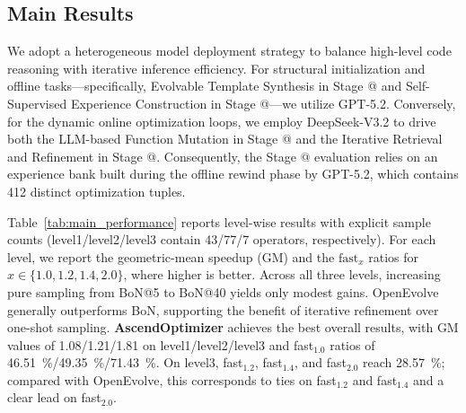 \documentclass{article}
\makeatletter
\theoremstyle{plain}
\theoremstyle{definition}
\theoremstyle{remark}
\newcommand{\Rmnum}[1]{\expandafter\@slowromancap\romannumeral #1@}
\makeatother
\begin{document}



\subsection{Main Results}

We adopt a heterogeneous model deployment strategy to balance high-level code reasoning with iterative inference efficiency. For structural initialization and offline tasks—specifically, Evolvable Template Synthesis in Stage \Rmnum{1} and Self-Supervised Experience Construction in Stage \Rmnum{2}—we utilize GPT-5.2. Conversely, for the dynamic online optimization loops, we employ DeepSeek-V3.2 to drive both the LLM-based Function Mutation in Stage \Rmnum{1} and the Iterative Retrieval and Refinement in Stage \Rmnum{2}. Consequently, the Stage \Rmnum{2} evaluation relies on an experience bank built during the offline rewind phase by GPT-5.2, which contains 412 distinct optimization tuples.



Table~\ref{tab:main_performance} reports level-wise results with explicit sample counts (level1/level2/level3 contain 43/77/7 operators, respectively). For each level, we report the geometric-mean speedup (GM) and the $\text{fast}_x$ ratios for $x \in \{1.0, 1.2, 1.4, 2.0\}$, where higher is better.
Across all three levels, increasing pure sampling from BoN@5 to BoN@40 yields only modest gains. OpenEvolve~\cite{openevolve} generally outperforms BoN, supporting the benefit of iterative refinement over one-shot sampling.
\textbf{AscendOptimizer} achieves the best overall results, with GM values of 1.08/1.21/1.81 on level1/level2/level3 and fast$_{1.0}$ ratios of \SI{46.51}{\percent}/\SI{49.35}{\percent}/\SI{71.43}{\percent}. On level3, fast$_{1.2}$, fast$_{1.4}$, and fast$_{2.0}$ reach \SI{28.57}{\percent}; compared with OpenEvolve, this corresponds to ties on fast$_{1.2}$ and fast$_{1.4}$ and a clear lead on fast$_{2.0}$.
\end{document}
